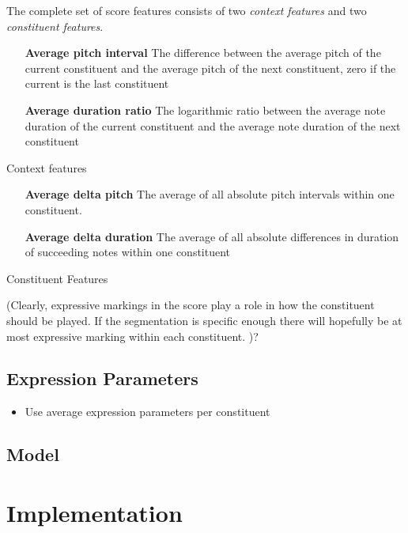 \documentclass[a4paper,10pt]{article}
\begin{document}
The complete set of score features consists of two \textit{context features} and two \textit{constituent features}.

\begin{table}
\begin{itemize}
\item[\textbf{Average pitch interval}] 
The difference between the average pitch of the current constituent and the average pitch of the next constituent, zero if the current is the last constituent
\item[\textbf{Average duration ratio}]
The logarithmic ratio between the average note duration of the current constituent and the average note duration of the next constituent
\end{itemize}
\caption{Context features}
\label{features}
\end{table}

\begin{table}
\begin{itemize}
\item[\textbf{Average delta pitch}] The average of all absolute pitch intervals within one constituent. 
\item[\textbf{Average delta duration}] The average of all absolute differences in duration of succeeding notes within one constituent
\end{itemize}
\caption{Constituent Features}
\label{features}
\end{table}

(Clearly, expressive markings in the score play a role in how the constituent should be played. If the segmentation is specific enough  there will hopefully be at most expressive marking within each constituent. )?

\subsection{Expression Parameters}
\label{targets}

\begin{itemize}
\item Use average expression parameters per constituent
\end{itemize}

\subsection{Model}

\section{Implementation}
\end{document}
